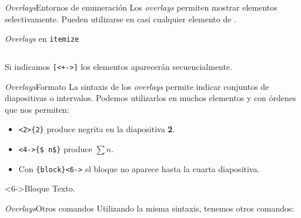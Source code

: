 \begin{frame}[fragile]{\textit{Overlays}}{Entornos de enumeración}
  Los \textit{overlays} permiten mostrar elementos selectivamente.
  Pueden utilizarse en casi cualquier elemento de \beamer.

  \espacio

  \begin{exampleblock}{\textit{Overlays} en \texttt{itemize}}

  \begin{columns}
  \end{columns}
  \espacio
  Si indicamos \texttt{[<+->]} los elementos aparecerán secuencialmente.
  \end{exampleblock}
\end{frame}

\begin{frame}{\textit{Overlays}}{Formato}
  La sintaxis de los \textit{overlays} permite indicar conjuntos de diapositivas
  o intervalos. Podemos utilizarlos en muchos elementos y con órdenes que nos permiten:
    \espacio

    \begin{itemize}
      \item {}\texttt{\alert<1>{<2>}\{2\}} produce negrita en la
      diapositiva \textbf<2>{2}.

      \item {}\texttt{\alert<3>{<4->}\{\$ n\$\}}
      produce \alert<4->{$\sum n$}.

      \item Con \texttt{\{block\}\alert<5>{<6->}} el
      bloque no aparece hasta la cuarta diapositiva.
    \end{itemize}

    \begin{block}<6->{Bloque}
      Texto.
    \end{block}
\end{frame}

\begin{frame}[fragile]{\textit{Overlays}}{Otros comandos}
  Utilizando la misma sintaxis, tenemos otros comandos:
  \espacio
\end{frame}

